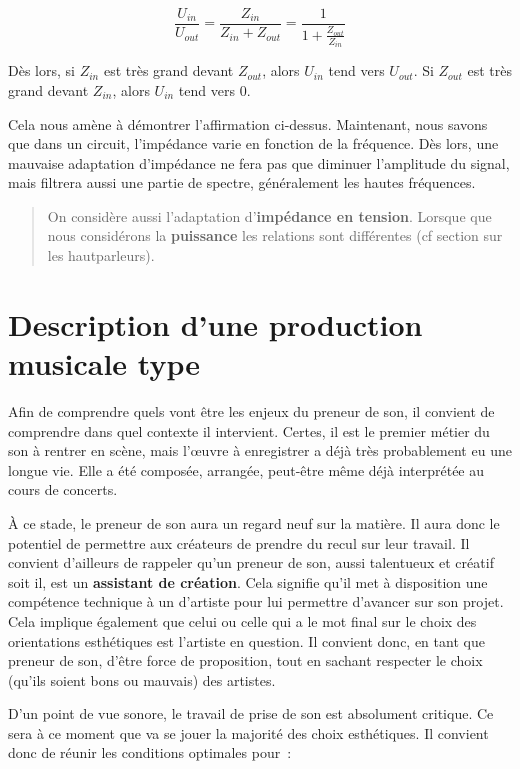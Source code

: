 \documentclass[
  letterpaper,
  DIV=11,
  numbers=noendperiod]{scrreprt}
\begin{document}
\[ \frac{U_{in}}{U_{out}} = \frac{Z_{in}}{Z_{in} + Z_{out}} = \frac{1}{1+\frac{Z_{out}}{Z_{in}}} \]

Dès lors, si \(Z_{in}\) est très grand devant \(Z_{out}\), alors
\(U_{in}\) tend vers \(U_{out}\). Si \(Z_{out}\) est très grand devant
\(Z_{in}\), alors \(U_{in}\) tend vers \(0\).

Cela nous amène à démontrer l'affirmation ci-dessus. Maintenant, nous
savons que dans un circuit, l'impédance varie en fonction de la
fréquence. Dès lors, une mauvaise adaptation d'impédance ne fera pas que
diminuer l'amplitude du signal, mais filtrera aussi une partie de
spectre, généralement les hautes fréquences.

\begin{quote}
On considère aussi l'adaptation d'\textbf{impédance en tension}. Lorsque
que nous considérons la \textbf{puissance} les relations sont
différentes (cf section sur les hautparleurs).
\end{quote}

\hypertarget{description-dune-production-musicale-type}{%
\chapter{Description d'une production musicale
type}\label{description-dune-production-musicale-type}}

Afin de comprendre quels vont être les enjeux du preneur de son, il
convient de comprendre dans quel contexte il intervient. Certes, il est
le premier métier du son à rentrer en scène, mais l'œuvre à enregistrer
a déjà très probablement eu une longue vie. Elle a été composée,
arrangée, peut-être même déjà interprétée au cours de concerts.

À ce stade, le preneur de son aura un regard neuf sur la matière. Il
aura donc le potentiel de permettre aux créateurs de prendre du recul
sur leur travail. Il convient d'ailleurs de rappeler qu'un preneur de
son, aussi talentueux et créatif soit il, est un \textbf{assistant de
création}. Cela signifie qu'il met à disposition une compétence
technique à un d'artiste pour lui permettre d'avancer sur son projet.
Cela implique également que celui ou celle qui a le mot final sur le
choix des orientations esthétiques est l'artiste en question. Il
convient donc, en tant que preneur de son, d'être force de proposition,
tout en sachant respecter le choix (qu'ils soient bons ou mauvais) des
artistes.

D'un point de vue sonore, le travail de prise de son est absolument
critique. Ce sera à ce moment que va se jouer la majorité des choix
esthétiques. Il convient donc de réunir les conditions optimales pour~:
\end{document}
